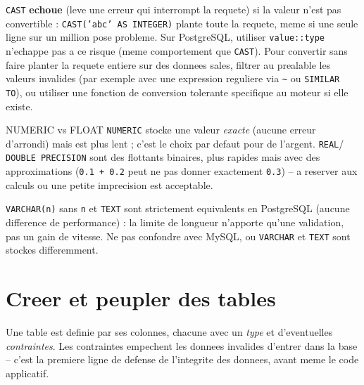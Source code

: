 \documentclass[11pt,a4paper]{article}
\begin{document}
\begin{piege}
\texttt{CAST} \textbf{echoue} (leve une erreur qui interrompt la requete) si la
valeur n'est pas convertible : \texttt{CAST('abc' AS INTEGER)} plante toute la
requete, meme si une seule ligne sur un million pose probleme. Sur PostgreSQL,
utiliser \texttt{value::type} n'echappe pas a ce risque (meme comportement que
\texttt{CAST}). Pour convertir sans faire planter la requete entiere sur des
donnees sales, filtrer au prealable les valeurs invalides (par exemple avec une
expression reguliere via \texttt{\textasciitilde} ou \texttt{SIMILAR TO}), ou
utiliser une fonction de conversion tolerante specifique au moteur si elle
existe.
\end{piege}

\begin{infobox}{NUMERIC vs FLOAT}
\texttt{NUMERIC} stocke une valeur \emph{exacte} (aucune erreur d'arrondi) mais
est plus lent ; c'est le choix par defaut pour de l'argent. \texttt{REAL}/
\texttt{DOUBLE PRECISION} sont des flottants binaires, plus rapides mais avec
des approximations (\texttt{0.1 + 0.2} peut ne pas donner exactement
\texttt{0.3}) -- a reserver aux calculs ou une petite imprecision est
acceptable.
\end{infobox}

\begin{piege}
\texttt{VARCHAR(n)} sans \texttt{n} et \texttt{TEXT} sont strictement
equivalents en PostgreSQL (aucune difference de performance) : la limite de
longueur n'apporte qu'une validation, pas un gain de vitesse. Ne pas confondre
avec MySQL, ou \texttt{VARCHAR} et \texttt{TEXT} sont stockes differemment.
\end{piege}

\section{Creer et peupler des tables}
Une table est definie par ses colonnes, chacune avec un \emph{type} et
d'eventuelles \emph{contraintes}. Les contraintes empechent les donnees
invalides d'entrer dans la base -- c'est la premiere ligne de defense de
l'integrite des donnees, avant meme le code applicatif.
\end{document}
